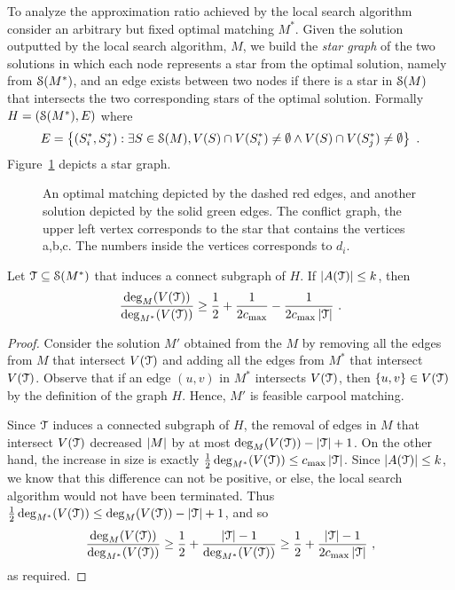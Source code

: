 To analyze the approximation ratio achieved by the local search
algorithm consider an arbitrary but fixed optimal matching $M^*$.
Given the solution outputted by the local search algorithm, $M$, we
build the \emph{star graph} of the two solutions in which each node
represents a star from the optimal solution, namely from $\mathcal{S}(M^*)$,
and an edge exists between two nodes if there is a star in $\mathcal{S}(M)$
that intersects the two corresponding stars of the optimal solution.
%
Formally $H = (\mathcal{S}(M^*), E)$ where
\[
E = \left\{ (S^*_i, S^*_j) : \exists S \in \mathcal{S}(M), 
         V(S) \cap V(S^*_i) \neq \emptyset \land
         V(S) \cap V(S^*_j) \neq \emptyset \right\}
~.
\]
Figure~\ref{fig:conflict} depicts a star graph.

\begin{figure}[t]
\centering
\subfloat[]{
\label{subfloat:graph}

}
\subfloat[]{
\label{subfloat:conflict}

}
\caption[]{
An optimal matching depicted by the dashed red edges,
and another solution depicted by the solid green edges.  
The conflict graph, the upper left vertex corresponds 
to the star that contains the vertices a,b,c.
The numbers inside the vertices corresponds to $d_i$.   
}
\label{fig:conflict}
\end{figure}  


\begin{lemma}
\label{lemma:r}
Let $\mathcal{T} \subseteq \mathcal{S}(M^*)$ that induces a connect subgraph of
$H$.  If $\left| A(\mathcal{T}) \right| \leq k$, then
\[
\frac{\deg_M(V(\mathcal{T}))}{\deg_{M^*}(V(\mathcal{T}))} 
\geq \frac{1}{2} + \frac{1}{2c_{\max}} - \frac{1}{2c_{\max}\left| \mathcal{T} \right|}
~.
\]
\end{lemma}
\begin{proof}
Consider the solution $M'$ obtained from the $M$ by removing all the
edges from $M$ that intersect $V(\mathcal{T})$ and adding all the edges from
$M^*$ that intersect $V(\mathcal{T})$.  Observe that if an edge $(u,v)$ in
$M^*$ intersects $V(\mathcal{T})$, then $\left\{ u,v \right\} \in V(\mathcal{T})$ by the
definition of the graph $H$.  Hence, $M'$ is feasible carpool
matching.

Since $\mathcal{T}$ induces a connected subgraph of $H$, the removal of
edges in $M$ that intersect $V(\mathcal{T})$ decreased $\left| M \right|$ by at most
$\deg_M(V(\mathcal{T})) - \left| \mathcal{T} \right| + 1$.
%
On the other hand, the increase in size is exactly
 $\frac{1}{2} \deg_{M^*}(V(\mathcal{T})) \leq c_{\max} \left| \mathcal{T} \right|$.
%
Since $\left| A(\mathcal{T}) \right| \leq k$, we know that this difference can not be
positive, or else, the local search algorithm would not have been
terminated.  Thus 
\(
\frac{1}{2} \deg_{M^*}(V(\mathcal{T})) \leq \deg_M(V(\mathcal{T})) - \left| \mathcal{T} \right| + 1
\),
and so
\[
\frac{\deg_M(V(\mathcal{T}))}{\deg_{M^*}(V(\mathcal{T}))}
\geq \frac{1}{2} + \frac{\left| \mathcal{T} \right| - 1}{\deg_{M^*}(V(\mathcal{T}))}
\geq \frac{1}{2} + \frac{\left| \mathcal{T} \right| - 1}{2c_{\max} \left| \mathcal{T} \right|}
~,
\]
as required.
\end{proof}



